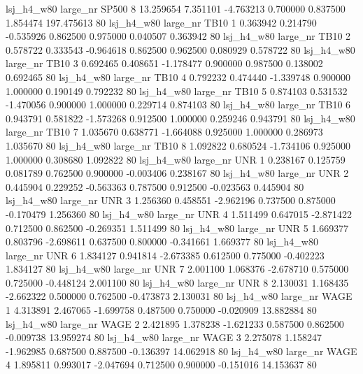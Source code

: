   lsj_h4_w80   large_nr    SP500                 8 13.259654  7.351101  -4.763213 0.700000 0.837500  1.854474  197.475613 80
  lsj_h4_w80   large_nr     TB10                 1  0.363942  0.214790  -0.535926 0.862500 0.975000  0.040507    0.363942 80
  lsj_h4_w80   large_nr     TB10                 2  0.578722  0.333543  -0.964618 0.862500 0.962500  0.080929    0.578722 80
  lsj_h4_w80   large_nr     TB10                 3  0.692465  0.408651  -1.178477 0.900000 0.987500  0.138002    0.692465 80
  lsj_h4_w80   large_nr     TB10                 4  0.792232  0.474440  -1.339748 0.900000 1.000000  0.190149    0.792232 80
  lsj_h4_w80   large_nr     TB10                 5  0.874103  0.531532  -1.470056 0.900000 1.000000  0.229714    0.874103 80
  lsj_h4_w80   large_nr     TB10                 6  0.943791  0.581822  -1.573268 0.912500 1.000000  0.259246    0.943791 80
  lsj_h4_w80   large_nr     TB10                 7  1.035670  0.638771  -1.664088 0.925000 1.000000  0.286973    1.035670 80
  lsj_h4_w80   large_nr     TB10                 8  1.092822  0.680524  -1.734106 0.925000 1.000000  0.308680    1.092822 80
  lsj_h4_w80   large_nr      UNR                 1  0.238167  0.125759   0.081789 0.762500 0.900000 -0.003406    0.238167 80
  lsj_h4_w80   large_nr      UNR                 2  0.445904  0.229252  -0.563363 0.787500 0.912500 -0.023563    0.445904 80
  lsj_h4_w80   large_nr      UNR                 3  1.256360  0.458551  -2.962196 0.737500 0.875000 -0.170479    1.256360 80
  lsj_h4_w80   large_nr      UNR                 4  1.511499  0.647015  -2.871422 0.712500 0.862500 -0.269351    1.511499 80
  lsj_h4_w80   large_nr      UNR                 5  1.669377  0.803796  -2.698611 0.637500 0.800000 -0.341661    1.669377 80
  lsj_h4_w80   large_nr      UNR                 6  1.834127  0.941814  -2.673385 0.612500 0.775000 -0.402223    1.834127 80
  lsj_h4_w80   large_nr      UNR                 7  2.001100  1.068376  -2.678710 0.575000 0.725000 -0.448124    2.001100 80
  lsj_h4_w80   large_nr      UNR                 8  2.130031  1.168435  -2.662322 0.500000 0.762500 -0.473873    2.130031 80
  lsj_h4_w80   large_nr     WAGE                 1  4.313891  2.467065  -1.699758 0.487500 0.750000 -0.020909   13.882884 80
  lsj_h4_w80   large_nr     WAGE                 2  2.421895  1.378238  -1.621233 0.587500 0.862500 -0.009738   13.959274 80
  lsj_h4_w80   large_nr     WAGE                 3  2.275078  1.158247  -1.962985 0.687500 0.887500 -0.136397   14.062918 80
  lsj_h4_w80   large_nr     WAGE                 4  1.895811  0.993017  -2.047694 0.712500 0.900000 -0.151016   14.153637 80
